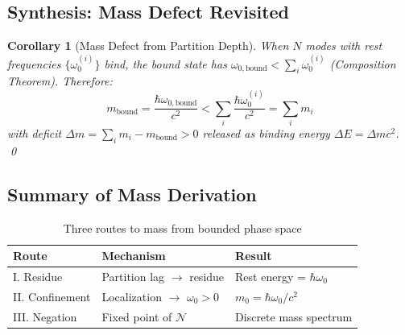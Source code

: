 \documentclass[twocolumn,10pt,a4paper]{article}
\newtheorem{corollary}[theorem]{Corollary}
\theoremstyle{definition}
\theoremstyle{remark}
\begin{document}
\subsection{Synthesis: Mass Defect Revisited}

\begin{corollary}[Mass Defect from Partition Depth]
\label{cor:mass-defect}
When $N$ modes with rest frequencies $\{\omega_0^{(i)}\}$ bind, the bound state has $\omega_{0,\text{bound}} < \sum_i \omega_0^{(i)}$ (Composition Theorem). Therefore:
\begin{equation}
    m_{\text{bound}} = \frac{\hbar\omega_{0,\text{bound}}}{c^2} < \sum_i \frac{\hbar\omega_0^{(i)}}{c^2} = \sum_i m_i
\end{equation}
with deficit $\Delta m = \sum_i m_i - m_{\text{bound}} > 0$ released as binding energy $\Delta E = \Delta mc^2$. \qed
\end{corollary}

\subsection{Summary of Mass Derivation}

\begin{table}[H]
\centering
\caption{Three routes to mass from bounded phase space}
\label{tab:mass-routes}
\small
\begin{tabular}{lll}
\toprule
\textbf{Route} & \textbf{Mechanism} & \textbf{Result} \\
\midrule
I. Residue & Partition lag $\to$ residue & Rest energy = $\hbar\omega_0$ \\
II. Confinement & Localization $\to$ $\omega_0 > 0$ & $m_0 = \hbar\omega_0/c^2$ \\
III. Negation & Fixed point of $\mathcal{N}$ & Discrete mass spectrum \\
\bottomrule
\end{tabular}
\end{table}
\end{document}
